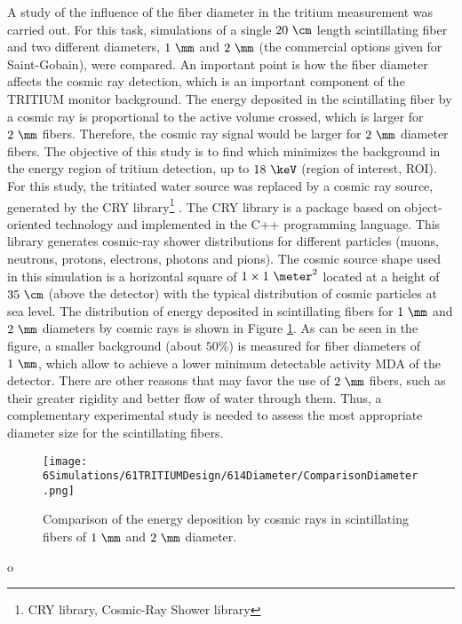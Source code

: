 A study of the influence of the fiber diameter in the tritium measurement was carried out. For this task, simulations of a single $20~\cm$ length scintillating fiber and two different diameters, $1~\mm$ and $2~\mm$ (the commercial options given for Saint-Gobain), were compared. An important point is how the fiber diameter affects the cosmic ray detection, which is an important component of the TRITIUM monitor background. The energy deposited in the scintillating fiber by a cosmic ray is proportional to the active volume crossed, which is larger for $2~\mm$ fibers. Therefore, the cosmic ray signal would be larger for $2~\mm$ diameter fibers. The objective of this study is to find which minimizes the background in the energy region of tritium detection, up to $18~\keV$ (region of interest, ROI). For this study, the tritiated water source was replaced by a cosmic ray source, generated by the CRY library\footnote{CRY library, Cosmic-Ray Shower library} \cite{CRYwebsite, CRYpaper}. The CRY library is a package based on object-oriented technology and implemented in the C++ programming language. This library generates cosmic-ray shower distributions for different particles (muons, neutrons, protons, electrons, photons and pions). The cosmic source shape used in this simulation is a horizontal square of $1 \times 1~\meter ^2$ located at a height of $35~\cm$ (above the detector) with the typical distribution of cosmic particles at sea level. The distribution of energy deposited in scintillating fibers for $1~\mm$ and $2~\mm$ diameters by cosmic rays is shown in Figure \ref{fig:DiameterComparison}. As can be seen in the figure, a smaller background (about $50\%$) is measured for fiber diameters of $1~\mm$, which allow to achieve a lower minimum detectable activity MDA of the detector. There are other reasons that may favor the use of $2~\mm$ fibers, such as their greater rigidity and better flow of water through them. Thus, a complementary experimental study is needed to assess the most appropriate diameter size for the scintillating fibers.

\begin{figure}[hbtp]
\centering
\texttt{[image: 6Simulations/61TRITIUMDesign/614Diameter/ComparisonDiameter.png]}
\caption{Comparison of the energy deposition by cosmic rays in scintillating fibers of $1~\mm$ and $2~\mm$ diameter.\label{fig:DiameterComparison}}
\end{figure}o